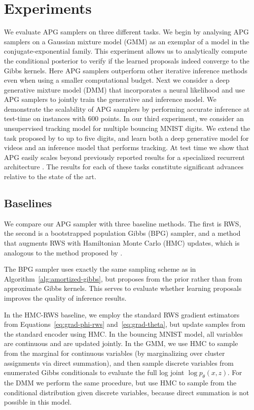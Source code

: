 \documentclass{article}
\theoremstyle{definition}
\begin{document}
\vspace{-0.25em}
\section{Experiments}
\label{sec:experiments}

We evaluate APG samplers on three different tasks. 
We begin by analysing APG samplers on a Gaussian mixture model (GMM) as an exemplar of a model in the conjugate-exponential family. 
This experiment allows us to analytically compute the conditional posterior to verify if the learned proposals indeed converge to the Gibbs kernels.
Here APG samplers outperform other iterative inference methods even when using a smaller computational budget. Next we consider a deep generative mixture model (DMM) that incorporates a neural likelihood and use APG samplers to jointly train the generative and inference model. We demonstrate the scalability of APG samplers by performing accurate inference at test-time on instances with 600 points. In our third experiment, we consider an unsupervised tracking model for multiple bouncing MNIST digits. We extend the task proposed by \citet{srivastava2015unsupervised} to up to five digits, and learn both a deep generative model for videos and an inference model that performs tracking. At test time we show that APG easily scales beyond previously reported results for a specialized recurrent architecture \cite{kosiorek2018sequential}. The results for each of these tasks constitute significant advances relative to the state of the art. 


\subsection{Baselines}
\label{sec:baselines}

We compare our APG sampler with three baseline methods. The first is RWS, the second is a bootstrapped population Gibbs (BPG) sampler, and a method that augments RWS with Hamiltonian Monte Carlo (HMC) updates, which is analogous to the method proposed by \citet{hoffman2017learning}.

The BPG sampler uses exactly the same sampling scheme as in Algorithm~\ref{alg:amortized-gibbs}, but proposes from the prior rather than from  approximate Gibbs kernels. This serves  to evaluate whether learning proposals improves the quality of inference results. 

In the HMC-RWS baseline, we employ the standard RWS gradient estimators from Equations~\ref{eq:grad-phi-rws} and~\ref{eq:grad-theta}, but update samples from the standard encoder using HMC. In the bouncing MNIST model, all variables are continuous and are updated jointly. In the GMM, we use HMC to sample from the marginal for continuous variables (by marginalizing over cluster assignments via direct summation), and then sample discrete variables from enumerated Gibbs conditionals to evaluate the full log joint $\log p_\theta(x,z)$. For the DMM we perform the same procedure, but use HMC to sample from the conditional distribution given discrete variables, because direct summation is not possible in this model. 
\end{document}
